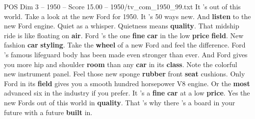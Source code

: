 \begin{textsample}{POS Dim 3 – 1950 – Score 15.00 – 1950/tv\_com\_1950\_99.txt}  \label{ex:f3_pos_001}
It 's out of this world.
Take a look at the new Ford for 1950.
It 's 50 ways new.
And \textbf{listen} to the new Ford engine.
Quiet as a whisper.
Quietness means \textbf{quality}.
That midship ride is like floating on \textbf{air}.
Ford 's the one \textbf{fine} \textbf{car} in the low \textbf{price} \textbf{field}.
New fashion \textbf{car} \textbf{styling}.
Take the \textbf{wheel} of a new Ford and feel the difference.
Ford 's famous lifeguard body has been made even stronger than ever.
And Ford gives you more hip and shoulder \textbf{room} than any \textbf{car} in its \textbf{class}.
Note the colorful new instrument panel.
Feel those new sponge \textbf{rubber} front \textbf{seat} cushions.
Only Ford in its \textbf{field} gives you a smooth hundred horsepower V8 engine.
Or the \textbf{most} advanced six in the industry if you prefer.
It 's a \textbf{fine} \textbf{car} at a low \textbf{price}.
Yes the new Fords out of this world in \textbf{quality}.
That 's why there 's a board in your future with a future \textbf{built} in.

\end{textsample}
